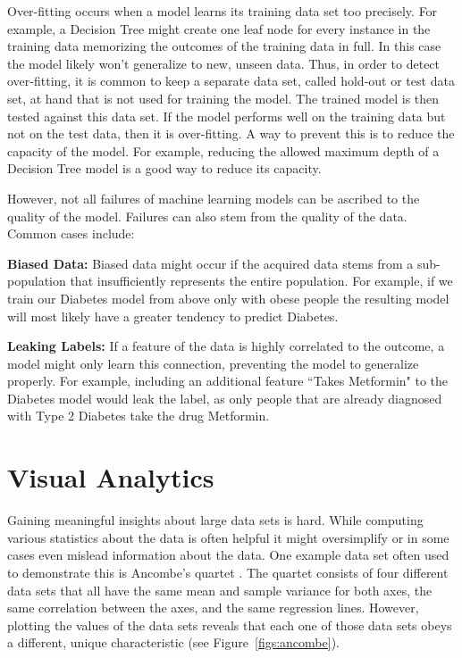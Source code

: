 Over-fitting occurs when a model learns its training data set too precisely.
For example, a Decision Tree might create one leaf node for every instance in the training data memorizing the outcomes of the training data in full.
In this case the model likely won't generalize to new, unseen data.
Thus, in order to detect over-fitting, it is common to keep a separate data set, called hold-out or test data set, at hand that is not used for training the model.
The trained model is then tested against this data set.
If the model performs well on the training data but not on the test data, then it is over-fitting.
A way to prevent this is to reduce the capacity of the model.
For example, reducing the allowed maximum depth of a Decision Tree model is a good way to reduce its capacity.

However, not all failures of machine learning models can be ascribed to the quality of the model.
Failures can also stem from the quality of the data.
Common cases include:

\par \noindent \textbf{Biased Data:}
Biased data might occur if the acquired data stems from a sub-population that insufficiently represents the entire population.
For example, if we train our Diabetes model from above only with obese people the resulting model will most likely have a greater tendency to predict Diabetes.

\par \noindent \textbf{Leaking Labels:}
If a feature of the data is highly correlated to the outcome, a model might only learn this connection, preventing the model to generalize properly.
For example, including an additional feature ``Takes Metformin" to the Diabetes model would leak the label, as only people that are already diagnosed with Type 2 Diabetes take the drug Metformin.

\section{Visual Analytics}
Gaining meaningful insights about large data sets is hard.
While computing various statistics about the data is often helpful it might oversimplify or in some cases even mislead information about the data.
One example data set often used to demonstrate this is Ancombe's quartet .
The quartet consists of four different data sets that all have the same mean and sample variance for both axes, the same correlation between the axes, and the same regression lines.
However, plotting the values of the data sets reveals that each one of those data sets obeys a different, unique characteristic (see Figure~\ref{figs:ancombe}).

